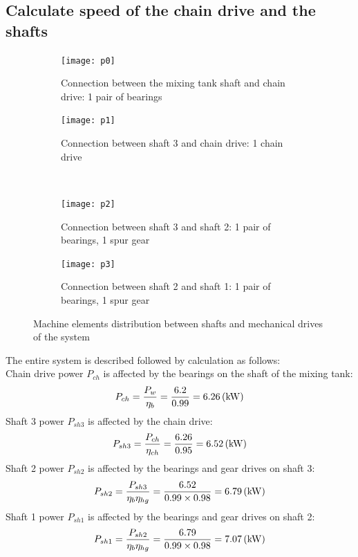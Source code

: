 \subsection{Calculate speed of  the chain drive and the shafts}
\begin{figure}[h]
	\centering
	\begin{subfigure}[t]{.4\linewidth}
		\centering
		\texttt{[image: p0]}
		\caption{Connection between the mixing tank shaft and chain drive: 1 pair of bearings}
		\label{fig:sub1}
	\end{subfigure}\hspace*{0.1\linewidth}
	\begin{subfigure}[t]{.4\linewidth}
		\centering
		\texttt{[image: p1]}
		\caption{Connection between shaft 3 and chain drive: 1 chain drive}
		\label{fig:sub2}
	\end{subfigure}\\
	\begin{subfigure}[t]{.4\linewidth}
		\centering
		\texttt{[image: p2]}
		\caption{Connection between shaft 3 and shaft 2: 1 pair of bearings, 1 spur gear}
		\label{fig:sub3}
	\end{subfigure}\hspace*{0.1\linewidth}	
	\begin{subfigure}[t]{.4\linewidth}
		\centering
		\texttt{[image: p3]}
		\caption{Connection between shaft 2 and shaft 1: 1 pair of bearings, 1 spur gear}
		\label{fig:sub4}
	\end{subfigure}
	\caption{Machine elements distribution between shafts and mechanical drives of the system}
	\label{fig:test}
\end{figure}
The entire system is described followed by calculation as follows:\\
Chain drive power $ P_{ch} $ is affected by the bearings on the shaft of the mixing tank:
\[ P_{ch} = \dfrac{P_w}{\eta_b} = \dfrac{6.2}{0.99} = 6.26 \, (\mathrm{kW})\]
Shaft 3 power $ P_{sh3} $ is affected by the chain drive:
\[ P_{sh3} = \dfrac{P_{ch}}{\eta_{ch}} = \dfrac{6.26}{0.95} = 6.52 \, (\mathrm{kW})\]
Shaft 2 power $ P_{sh2} $ is affected by the bearings and gear drives on shaft 3:
\[ P_{sh2} = \dfrac{P_{sh3}}{\eta_b\eta_{hg}} = \dfrac{6.52}{0.99 \times 0.98} = 6.79 \, (\mathrm{kW})\]
Shaft 1 power $ P_{sh1} $ is affected by the bearings and gear drives on shaft 2:
\[ P_{sh1} = \dfrac{P_{sh2}}{\eta_b\eta_{hg}} = \dfrac{6.79}{0.99 \times 0.98} = 7.07 \, (\mathrm{kW})\]

